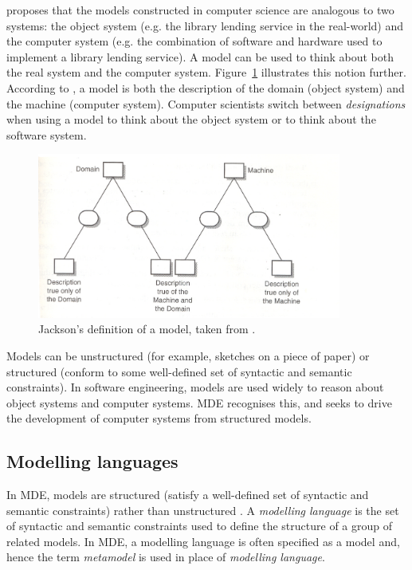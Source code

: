 \cite{jackson95software} proposes that the models constructed in computer science are analogous to two systems: the object system (e.g. the library lending service in the real-world) and the computer system (e.g. the combination of software and hardware used to implement a library lending service). A model can be used to think about both the real system and the computer system. Figure~\ref{fig:jackson_model} illustrates this notion further. According to \cite{jackson95software}, a model is both the description of the domain (object system) and the machine (computer system). Computer scientists switch between \emph{designations} when using a model to think about the object system or to think about the software system.

\begin{figure}[htbp]
  \begin{center}
    \leavevmode
    \includegraphics[width=10cm]{2.Background/images/jackson_model.png}
  \end{center}
  \caption{Jackson's definition of a model, taken from \cite[pg.125]{jackson95software}.}
  \label{fig:jackson_model}
\end{figure}

Models can be unstructured (for example, sketches on a piece of paper) or structured (conform to some well-defined set of syntactic and semantic constraints). In software engineering, models are used widely to reason about object systems and computer systems. MDE recognises this, and seeks to drive the development of computer systems from structured models.

\subsection{Modelling languages}
\label{subsec:modelling_languages}
In MDE, models are structured (satisfy a well-defined set of syntactic and semantic constraints) rather than unstructured \cite{kolovos09thesis}. A \emph{modelling language} is the set of syntactic and semantic constraints used to define the structure of a group of related models. In MDE, a modelling language is often specified as a model and, hence the term \emph{metamodel} is used in place of \emph{modelling language}.

